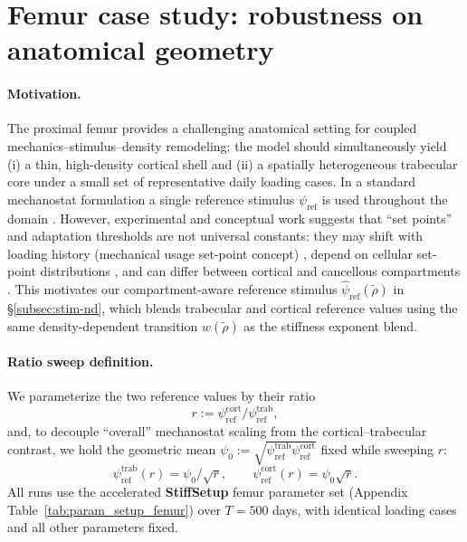 \section*{Femur case study: robustness on anatomical geometry}
\label{sec:femur-comparison}

\paragraph{Motivation.}
The proximal femur provides a challenging anatomical setting for coupled mechanics--stimulus--density remodeling: the model should simultaneously yield (i) a thin, high-density cortical shell and (ii) a spatially heterogeneous trabecular core under a small set of representative daily loading cases.
In a standard mechanostat formulation a single reference stimulus $\psi_{\mathrm{ref}}$ is used throughout the domain \cite{Weinans1992_BehaviorAdaptiveBoneRemodeling,MartinezReina2016_UniquenessBRM}.
However, experimental and conceptual work suggests that ``set points'' and adaptation thresholds are not universal constants: they may shift with loading history (mechanical usage set-point concept) \cite{Frost1992_SetPointsOsteoporosis}, depend on cellular set-point distributions \cite{Mullender1998_SetPointTrabecularArchitecture}, and can differ between cortical and cancellous compartments \cite{Yang2021_CancellousGreaterThreshold,Schulte2013_LocalMechanicalStimuli}.
This motivates our compartment-aware reference stimulus $\hat{\psi}_{\mathrm{ref}}(\widetilde\rho)$ in \S\ref{subsec:stim-nd}, which blends trabecular and cortical reference values using the same density-dependent transition $w(\widetilde\rho)$ as the stiffness exponent blend.

\paragraph{Ratio sweep definition.}
We parameterize the two reference values by their ratio
\[
r:=\psi_{\mathrm{ref}}^{\mathrm{cort}}/\psi_{\mathrm{ref}}^{\mathrm{trab}},
\]
and, to decouple ``overall'' mechanostat scaling from the cortical--trabecular contrast, we hold the geometric mean $\psi_0:=\sqrt{\psi_{\mathrm{ref}}^{\mathrm{trab}}\psi_{\mathrm{ref}}^{\mathrm{cort}}}$ fixed while sweeping $r$:
\[
\psi_{\mathrm{ref}}^{\mathrm{trab}}(r)=\psi_0/\sqrt{r},\qquad
\psi_{\mathrm{ref}}^{\mathrm{cort}}(r)=\psi_0\sqrt{r}.
\]
All runs use the accelerated \textbf{StiffSetup} femur parameter set (Appendix Table~\ref{tab:param_setup_femur}) over $T=500$ days, with identical loading cases and all other parameters fixed.

